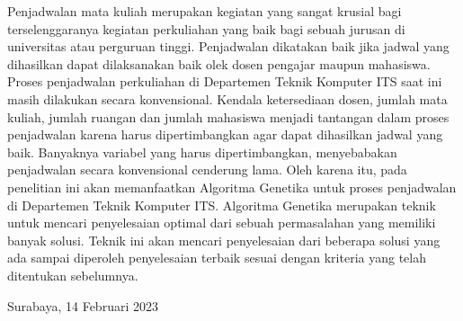Penjadwalan mata kuliah merupakan kegiatan yang sangat krusial bagi 
terselenggaranya kegiatan perkuliahan yang baik bagi sebuah jurusan di 
universitas atau perguruan tinggi. \linebreak Penjadwalan dikatakan baik jika jadwal yang dihasilkan dapat 
dilaksanakan baik olek dosen pengajar maupun mahasiswa. Proses penjadwalan perkuliahan 
di Departemen Teknik Komputer ITS saat ini masih dilakukan secara konvensional. 
Kendala ketersediaan dosen, jumlah mata kuliah, jumlah ruangan dan jumlah mahasiswa menjadi tantangan dalam proses penjadwalan karena harus 
dipertimbangkan agar dapat dihasilkan jadwal yang baik. Banyaknya variabel yang harus dipertimbangkan, 
menyebabakan penjadwalan secara konvensional cenderung lama. Oleh karena itu, pada penelitian ini 
akan memanfaatkan Algoritma Genetika untuk proses penjadwalan di Departemen Teknik Komputer ITS. 
Algoritma Genetika merupakan teknik untuk mencari penyelesaian optimal dari 
sebuah permasalahan yang memiliki banyak solusi. Teknik ini akan mencari penyelesaian dari beberapa 
solusi yang ada sampai diperoleh penyelesaian terbaik sesuai dengan kriteria yang telah ditentukan sebelumnya.

\vspace{1ex}

\begin{flushright}
  Surabaya, 14 Februari 2023
\end{flushright}
\vspace{1ex}


